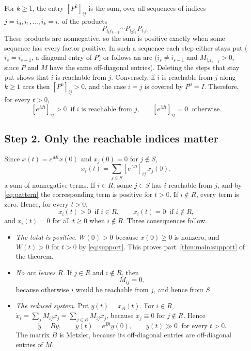 \documentclass[11pt]{article}
\theoremstyle{definition}
\theoremstyle{remark}
\begin{document}
For $k \ge 1$, the entry $[P^k]_{ij}$ is the sum, over all sequences of indices $j = i_0, i_1, \dots, i_k = i$,
of the products
\[
  P_{i_k i_{k-1}} \cdots P_{i_2 i_1} P_{i_1 i_0} .
\]
These products are nonnegative, so the sum is positive exactly when some sequence has every factor
positive. In such a sequence each step
either stays put ($i_s = i_{s-1}$, a diagonal entry of $P$) or follows an arc
($i_s \ne i_{s-1}$ and $M_{i_s i_{s-1}} > 0$, since $P$ and $M$ have the same off-diagonal
entries). Deleting the steps that stay put shows that $i$ is reachable from $j$. Conversely, if $i$
is reachable from $j$ along $k \ge 1$ arcs then $[P^k]_{ij} > 0$, and the case $i = j$ is covered by
$P^0 = I$. Therefore, for every $t > 0$,
\begin{equation}\label{eq:pattern}
  [e^{Mt}]_{ij} > 0 \ \text{ if $i$ is reachable from $j$,}
  \qquad
  [e^{Mt}]_{ij} = 0 \ \text{ otherwise.}
\end{equation}

\subsection*{Step 2. Only the reachable indices matter}

Since $x(t) = e^{Mt} x(0)$ and $x_j(0) = 0$ for $j \notin S$,
\[
  x_i(t) = \sum_{j \in S} [e^{Mt}]_{ij}\, x_j(0) ,
\]
a sum of nonnegative terms. If $i \in R$, some $j \in S$ has $i$ reachable from $j$, and by
\eqref{eq:pattern} the corresponding term is positive for $t > 0$. If $i \notin R$, every term is
zero. Hence, for every $t > 0$,
\begin{equation}\label{eq:support}
  x_i(t) > 0 \ \text{ if } i \in R,
  \qquad
  x_i(t) = 0 \ \text{ if } i \notin R,
\end{equation}
and $x_i(t) = 0$ for all $t \ge 0$ when $i \notin R$. Three consequences follow.

\begin{itemize}[leftmargin=2em]
  \item \emph{The total is positive.} $W(0) > 0$ because $x(0) \ge 0$ is nonzero, and $W(t) > 0$
        for $t > 0$ by \eqref{eq:support}. This proves
        part~\ref{thm:main:support} of the theorem.
  \item \emph{No arc leaves $R$.} If $j \in R$ and $i \notin R$, then
        \begin{equation}\label{eq:noarc}
          M_{ij} = 0 ,
        \end{equation}
        because otherwise $i$ would be reachable from $j$, and hence from $S$.
  \item \emph{The reduced system.} Put $y(t) = x_R(t)$. For $i \in R$,
        $\dot{x}_i = \sum_{j} M_{ij} x_j = \sum_{j \in R} M_{ij} x_j$, because $x_j \equiv 0$ for
        $j \notin R$. Hence
        \[
          \dot{y} = By, \qquad y(t) = e^{Bt} y(0), \qquad y(t) \gg 0 \ \text{ for every } t > 0 .
        \]
        The matrix $B$ is Metzler, because its off-diagonal entries are off-diagonal entries of $M$.
\end{itemize}
\end{document}
